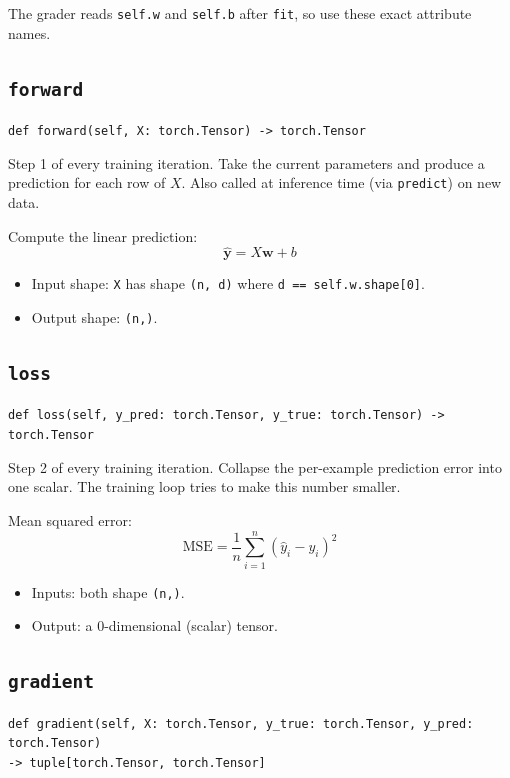 \documentclass[11pt]{article}
\newcommand{\code}[1]{\texttt{\small #1}}
\newcommand{\vw}{\mathbf{w}}
\newcommand{\vyhat}{\hat{\mathbf{y}}}
\begin{document}
The grader reads \code{self.w} and \code{self.b} after \code{fit}, so use these
exact attribute names.

\subsection{\texttt{forward}}

\noindent
\code{def forward(self, X: torch.Tensor) -> torch.Tensor}

\medskip\noindent
Step 1 of every training iteration. Take the current parameters
and produce a prediction for each row of $X$. Also called at inference time
(via \code{predict}) on new data.

\medskip\noindent
Compute the linear prediction:
\[
    \vyhat = X \vw + b
\]

\begin{itemize}
    \item Input shape: \code{X} has shape \code{(n, d)} where
          \code{d == self.w.shape[0]}.
    \item Output shape: \code{(n,)}.
\end{itemize}

\subsection{\texttt{loss}}

\noindent
\code{def loss(self, y\_pred: torch.Tensor, y\_true: torch.Tensor) -> torch.Tensor}

\medskip\noindent
Step 2 of every training iteration. Collapse the per-example
prediction error into one scalar. The training loop tries to make this number
smaller.

\medskip\noindent
Mean squared error:
\[
    \mathrm{MSE} = \frac{1}{n} \sum_{i=1}^{n} (\hat{y}_i - y_i)^2
\]

\begin{itemize}
    \item Inputs: both shape \code{(n,)}.
    \item Output: a 0-dimensional (scalar) tensor.
\end{itemize}

\subsection{\texttt{gradient}}

\noindent
\code{def gradient(self, X: torch.Tensor, y\_true: torch.Tensor, y\_pred: torch.Tensor)\\
\hspace*{2em}-> tuple[torch.Tensor, torch.Tensor]}
\end{document}
